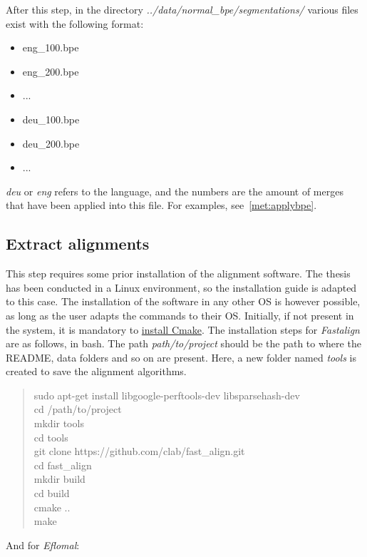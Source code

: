 After this step, in the directory \emph{../data/normal\_bpe/segmentations/} various files exist with the following format:

\begin{itemize}
  \item eng\_100.bpe
  \item eng\_200.bpe
  \item ...
  \item deu\_100.bpe
  \item deu\_200.bpe
  \item ...
\end{itemize}

\emph{deu} or \emph{eng} refers to the language, and the numbers are the amount of merges that have been applied into this file. For examples, see~\ref{met:applybpe}.

\subsection{Extract alignments}\label{dev:extractalign}

This step requires some prior installation of the alignment software. The thesis has been conducted in a Linux environment, so the installation guide is adapted to this case. The installation of the software in any other OS is however possible, as long as the user adapts the commands to their OS. Initially, if not present in the system, it is mandatory to \href{https://cmake.org/install/}{install Cmake}. The installation steps for \emph{Fastalign} are as follows, in bash. The path \emph{path/to/project} should be the path to where the README, data folders and so on are present. Here, a new folder named \emph{tools} is created to save the alignment algorithms.

\begin{quote}
  sudo apt-get install libgoogle-perftools-dev libsparsehash-dev\\
  cd /path/to/project\\
  mkdir tools\\
  cd tools\\
  git clone https://github.com/clab/fast\_align.git\\
  cd fast\_align\\
  mkdir build\\
  cd build\\
  cmake ..\\
  make
\end{quote}

And for \emph{Eflomal}:

